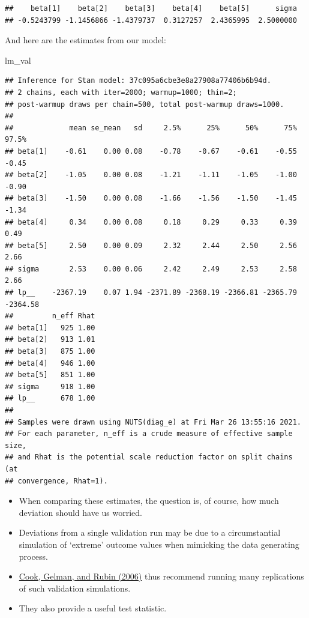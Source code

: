\documentclass[
  11pt,
]{article}
\newenvironment{Shaded}{\begin{snugshade}}{\end{snugshade}}
\newcommand{\NormalTok}[1]{#1}
\providecommand{\tightlist}{%
  \setlength{\itemsep}{0pt}\setlength{\parskip}{0pt}}
\begin{document}
\begin{verbatim}
##    beta[1]    beta[2]    beta[3]    beta[4]    beta[5]      sigma 
## -0.5243799 -1.1456866 -1.4379737  0.3127257  2.4365995  2.5000000
\end{verbatim}

And here are the estimates from our model:

\begin{Shaded}
\begin{Highlighting}[]
\NormalTok{lm\_val}
\end{Highlighting}
\end{Shaded}

\begin{verbatim}
## Inference for Stan model: 37c095a6cbe3e8a27908a77406b6b94d.
## 2 chains, each with iter=2000; warmup=1000; thin=2; 
## post-warmup draws per chain=500, total post-warmup draws=1000.
## 
##             mean se_mean   sd     2.5%      25%      50%      75%    97.5%
## beta[1]    -0.61    0.00 0.08    -0.78    -0.67    -0.61    -0.55    -0.45
## beta[2]    -1.05    0.00 0.08    -1.21    -1.11    -1.05    -1.00    -0.90
## beta[3]    -1.50    0.00 0.08    -1.66    -1.56    -1.50    -1.45    -1.34
## beta[4]     0.34    0.00 0.08     0.18     0.29     0.33     0.39     0.49
## beta[5]     2.50    0.00 0.09     2.32     2.44     2.50     2.56     2.66
## sigma       2.53    0.00 0.06     2.42     2.49     2.53     2.58     2.66
## lp__    -2367.19    0.07 1.94 -2371.89 -2368.19 -2366.81 -2365.79 -2364.58
##         n_eff Rhat
## beta[1]   925 1.00
## beta[2]   913 1.01
## beta[3]   875 1.00
## beta[4]   946 1.00
## beta[5]   851 1.00
## sigma     918 1.00
## lp__      678 1.00
## 
## Samples were drawn using NUTS(diag_e) at Fri Mar 26 13:55:16 2021.
## For each parameter, n_eff is a crude measure of effective sample size,
## and Rhat is the potential scale reduction factor on split chains (at 
## convergence, Rhat=1).
\end{verbatim}

\begin{itemize}
\tightlist
\item
  When comparing these estimates, the question is, of course, how much deviation should have us worried.
\item
  Deviations from a single validation run may be due to a circumstantial simulation of `extreme' outcome values when mimicking the data generating process.
\item
  \href{https://www.tandfonline.com/doi/abs/10.1198/106186006X136976}{Cook, Gelman, and Rubin (2006)} thus recommend running many replications of such validation simulations.
\item
  They also provide a useful test statistic.
\end{itemize}
\end{document}
